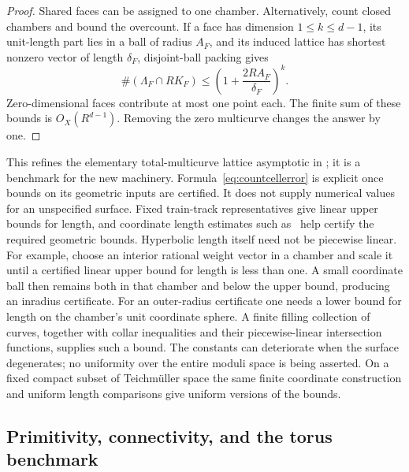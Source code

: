 \begin{proof}
Shared faces can be assigned to one chamber.  Alternatively, count
closed chambers and bound the overcount.  If a face has dimension
$1\leq k\leq d-1$, its unit-length part lies in a ball of radius $A_F$, and
its induced lattice has shortest nonzero vector of length $\delta_F$,
disjoint-ball packing gives
\[
 \#(\Lambda_F\cap RK_F)
 \leq\left(1+\frac{2RA_F}{\delta_F}\right)^k.
\]
Zero-dimensional faces contribute at most one point each.  The
finite sum of these bounds is $O_X(R^{d-1})$.
Removing the zero multicurve changes the answer by one.
\end{proof}

This refines the elementary total-multicurve lattice asymptotic in
\cite[Proposition 3.1]{MirzSimple}; it is a benchmark for the new
machinery.  Formula~\eqref{eq:countcellerror} is explicit once bounds
on its geometric inputs are certified.  It does not supply numerical
values for an unspecified surface.  Fixed train-track representatives
give linear upper bounds for length, and coordinate length estimates
such as~\cite{LuoStongLengths} help certify the required geometric
bounds.  Hyperbolic length itself need not be piecewise linear.
For example, choose an interior rational weight vector in a chamber
and scale it until a certified linear upper bound for length is less
than one.  A small coordinate ball then remains both in that chamber
and below the upper bound, producing an inradius certificate.
For an outer-radius certificate one needs a lower bound for length
on the chamber's unit coordinate sphere.  A finite filling collection
of curves, together with collar inequalities and their
piecewise-linear intersection functions, supplies such a bound.
The constants can deteriorate when the surface degenerates; no
uniformity over the entire moduli space is being asserted.
On a fixed compact subset of Teichm\"uller space the same finite
coordinate construction and uniform length comparisons give uniform
versions of the bounds.

\subsection{Primitivity, connectivity, and the torus benchmark}
\label{subsec:countprimitive}

